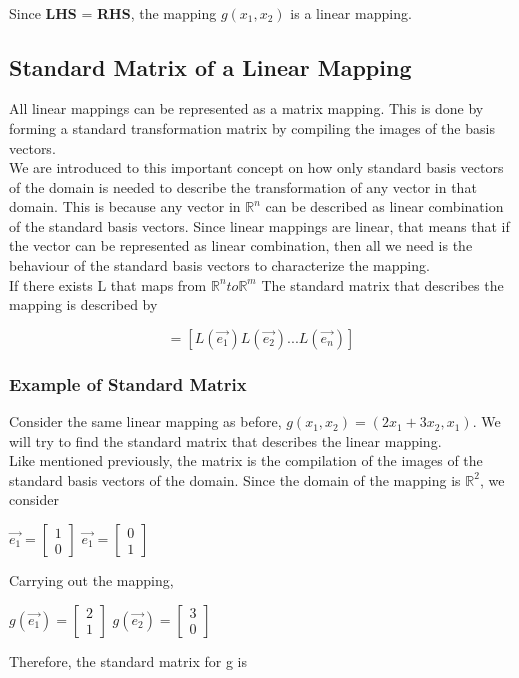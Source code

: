 \documentclass[12pt]{article}
\newcommand{\R}{\mathbb{R}}
\begin{document}
\begin{equation}
\begin{split}
\end{split}
\end{equation}


Since \textbf{LHS} = \textbf{RHS}, the mapping $g(x_1,x_2)$ is a linear mapping.

\subsection{Standard Matrix of a Linear Mapping}
All linear mappings can be represented as a matrix mapping. This is done by forming a standard transformation matrix by compiling the images of the basis vectors.\\
We are introduced to this important concept on how only standard basis vectors of the domain is needed to describe the transformation of any vector in that domain. This is because any vector in $\R^n$ can be described as linear combination of the standard basis vectors. Since linear mappings are linear, that means that if the vector can be represented as linear combination, then all we need is the behaviour of the standard basis vectors to characterize the mapping.\\
If there exists L that maps from $\R^n to \R^m$
The standard matrix that describes the mapping is described by 

\begin{equation}
[L] = [L(\vec{e_1}) L(\vec{e_2}) ... L(\vec{e_n})]
\end{equation}

\subsubsection{Example of Standard Matrix}
Consider the same linear mapping as before, $g(x_1,x_2) = (2x_1+3x_2 , x_1)$. We will try to find the standard matrix that describes the linear mapping.\\
Like mentioned previously, the matrix is the compilation of the images of the standard basis vectors of the domain. Since the domain of the mapping is $\R^2$, we consider\\
\begin{center}
$\vec{e_1} = \begin{bmatrix}1\\0\end{bmatrix}$
$\vec{e_1} = \begin{bmatrix}0\\1\end{bmatrix}$
\end{center}
Carrying out the mapping,
\begin{center}
$g(\vec{e_1}) = \begin{bmatrix}2\\1\end{bmatrix}$
$g(\vec{e_2}) = \begin{bmatrix}3\\0\end{bmatrix}$
\end{center}
Therefore, the standard matrix for g is 
\end{document}
